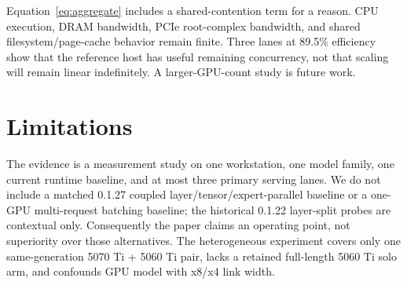 Equation~\ref{eq:aggregate} includes a shared-contention term for a reason. CPU execution, DRAM bandwidth, PCIe root-complex bandwidth, and shared filesystem/page-cache behavior remain finite. Three lanes at 89.5\% efficiency show that the reference host has useful remaining concurrency, not that scaling will remain linear indefinitely. A larger-GPU-count study is future work.

\section{Limitations}
The evidence is a measurement study on one workstation, one model family, one current runtime baseline, and at most three primary serving lanes. We do not include a matched 0.1.27 coupled layer/tensor/expert-parallel baseline or a one-GPU multi-request batching baseline; the historical 0.1.22 layer-split probes are contextual only. Consequently the paper claims an operating point, not superiority over those alternatives. The heterogeneous experiment covers only one same-generation 5070 Ti + 5060 Ti pair, lacks a retained full-length 5060 Ti solo arm, and confounds GPU model with x8/x4 link width.

